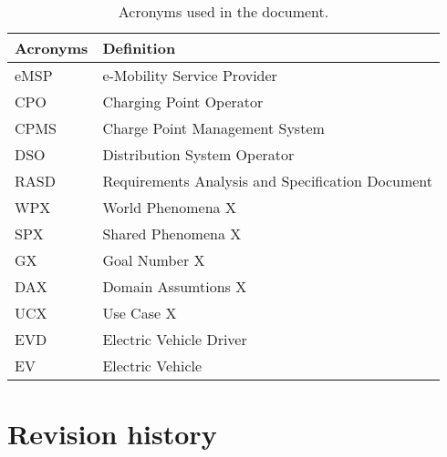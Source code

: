 \begin{table}[H]
    \begin{center}
        \begin{tabular}{ |l|l| }
            \hline
            \textbf{Acronyms} & \textbf{Definition}                              \\
            \hline
            eMSP              & e-Mobility Service Provider                      \\
            \hline
            CPO               & Charging Point Operator                          \\
            \hline
            CPMS              & Charge Point Management System                   \\
            \hline
            DSO               & Distribution System Operator                     \\
            \hline
            RASD              & Requirements Analysis and Specification Document \\
            \hline
            WPX               & World Phenomena X                                \\
            \hline
            SPX               & Shared Phenomena X                               \\
            \hline
            GX                & Goal Number X                                    \\
            \hline
            DAX               & Domain Assumtions X                              \\
            \hline
            UCX               & Use Case X                                       \\
            \hline
            EVD               & Electric Vehicle Driver                          \\
            \hline
            EV                & Electric Vehicle                                 \\
            \hline
        \end{tabular}
        \caption{Acronyms used in the document.}
        \label{tab:acronyms}%
    \end{center}
\end{table}


\section{Revision history}
\label{sec:revision_history}%



